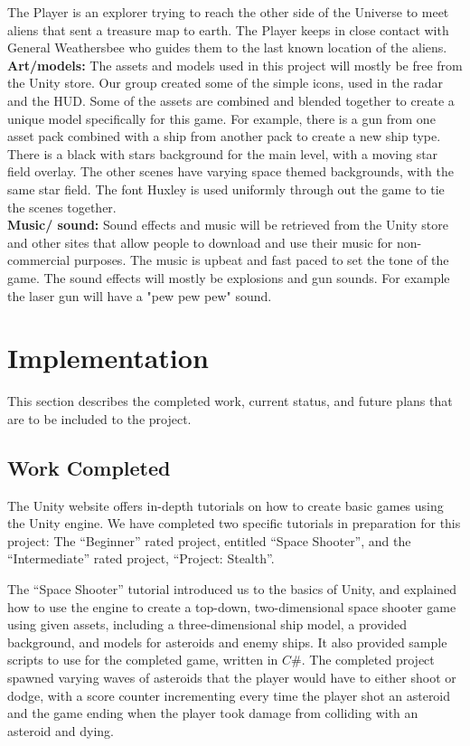 \documentclass[12pt]{article}       %
\def\hs{\hspace{15pt}}
\begin{document}
	\hs {\bf Story:} The Player is an explorer trying to reach the other side of the Universe to meet aliens that sent a treasure map to earth. The Player keeps in close contact with General Weathersbee who guides them to the last known location of the aliens. \\

	{\bf Art/models:} The assets and models used in this project will mostly be free from the Unity store. Our group created some of the simple icons, used in the radar and the HUD. Some of the assets are combined and blended together to create a unique model specifically for this game. For example, there is a gun from one asset pack combined with a ship from another pack to create a new ship type. There is a black with stars background for the main level, with a moving star field overlay. The other scenes have varying space themed backgrounds, with the same star field. The font Huxley is used uniformly through out the game to tie the scenes together.  \\

	{\bf Music/ sound:} Sound effects and music will be retrieved from the Unity store and other sites that allow people to download and use their music for non-commercial purposes. The music is upbeat and fast paced to set the tone of the game. The sound effects will mostly be explosions and gun sounds. For example the laser gun will have a "pew pew pew" sound. 



\section{Implementation} %
\label{sec:history}
This section describes the completed work, current status, and future plans that are to be included to the project.

\subsection{Work Completed}

\hs The Unity website offers in-depth tutorials on how to create basic games using the Unity engine. We have completed two specific tutorials in preparation for this project: The “Beginner” rated project, entitled “Space Shooter”, and the “Intermediate” rated project, “Project: Stealth”.

  The “Space Shooter” tutorial introduced us to the basics of Unity, and explained how to use the engine to create a top-down, two-dimensional space shooter game using given assets, including a three-dimensional ship model, a provided background, and models for asteroids and enemy ships. It also provided sample scripts to use for the completed game, written in $C\#$. The completed project spawned varying waves of asteroids that the player would have to either shoot or dodge, with a score counter incrementing every time the player shot an asteroid and the game ending when the player took damage from colliding with an asteroid and dying.
\end{document}
